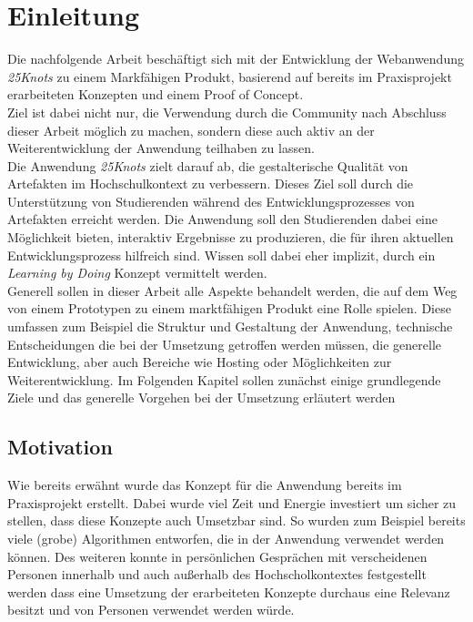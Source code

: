 \chapter{Einleitung}
\thispagestyle{fancy}
Die nachfolgende Arbeit beschäftigt sich mit der Entwicklung der Webanwendung \textit{25Knots} zu einem Markfähigen Produkt, basierend auf bereits im Praxisprojekt erarbeiteten Konzepten und einem Proof of Concept.\\
Ziel ist dabei nicht nur, die Verwendung durch die Community\footnotemark{} nach Abschluss dieser Arbeit möglich zu machen, sondern diese auch aktiv an der Weiterentwicklung der Anwendung teilhaben zu lassen.\\

Die Anwendung \textit{25Knots} zielt darauf ab, die gestalterische Qualität von Artefakten im Hochschulkontext zu verbessern. Dieses Ziel soll durch die Unterstützung von Studierenden während des Entwicklungsprozesses von Artefakten erreicht werden. Die Anwendung soll den Studierenden dabei eine Möglichkeit bieten, interaktiv Ergebnisse zu produzieren, die für ihren aktuellen Entwicklungsprozess hilfreich sind. Wissen soll dabei eher implizit, durch ein \textit{Learning by Doing} Konzept vermittelt werden.\\

Generell sollen in dieser Arbeit alle Aspekte behandelt werden, die auf dem Weg von einem Prototypen zu einem marktfähigen Produkt eine Rolle spielen. Diese umfassen zum Beispiel die Struktur und Gestaltung der Anwendung, technische Entscheidungen die bei der Umsetzung getroffen werden müssen, die generelle Entwicklung, aber auch Bereiche wie Hosting oder Möglichkeiten zur Weiterentwicklung.
Im Folgenden Kapitel sollen zunächst einige grundlegende Ziele und das generelle Vorgehen bei der Umsetzung erläutert werden


\section{Motivation}
Wie bereits erwähnt wurde das Konzept für die Anwendung bereits im Praxisprojekt erstellt. Dabei wurde viel Zeit und Energie investiert um sicher zu stellen, dass diese Konzepte auch Umsetzbar sind. So wurden zum Beispiel bereits viele (grobe) Algorithmen entworfen, die in der Anwendung verwendet werden können.
Des weiteren konnte in persönlichen Gesprächen mit verscheidenen Personen innerhalb und auch außerhalb des Hochscholkontextes festgestellt werden dass eine Umsetzung der erarbeiteten Konzepte durchaus eine Relevanz besitzt und von Personen verwendet werden würde.\\

